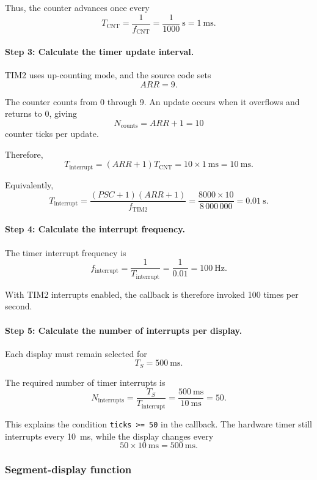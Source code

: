\documentclass[a4paper]{article}
\begin{document}
Thus, the counter advances once every
\[
    T_{\mathrm{CNT}}
    = \frac{1}{f_{\mathrm{CNT}}}
    = \frac{1}{1000}~\mathrm{s}
    = 1~\mathrm{ms}.
\]

\paragraph{Step 3: Calculate the timer update interval.}

TIM2 uses up-counting mode, and the source code sets
\[
    ARR = 9.
\]

The counter counts from 0 through 9. An update occurs
when it overflows and returns to 0, giving
\[
    N_{\mathrm{counts}} = ARR+1 = 10
\]
counter ticks per update.

Therefore,
\[
    T_{\mathrm{interrupt}}
    = (ARR+1)T_{\mathrm{CNT}}
    = 10 \times 1~\mathrm{ms}
    = 10~\mathrm{ms}.
\]

Equivalently,
\[
    T_{\mathrm{interrupt}}
    = \frac{(PSC+1)(ARR+1)}{f_{\mathrm{TIM2}}}
    = \frac{8000 \times 10}{8\,000\,000}
    = 0.01~\mathrm{s}.
\]

\paragraph{Step 4: Calculate the interrupt frequency.}

The timer interrupt frequency is
\[
    f_{\mathrm{interrupt}}
    = \frac{1}{T_{\mathrm{interrupt}}}
    = \frac{1}{0.01}
    = 100~\mathrm{Hz}.
\]

With TIM2 interrupts enabled, the callback is therefore
invoked 100 times per second.

\paragraph{Step 5: Calculate the number of interrupts per display.}

Each display must remain selected for
\[
    T_S = 500~\mathrm{ms}.
\]

The required number of timer interrupts is
\[
    N_{\mathrm{interrupts}}
    = \frac{T_S}{T_{\mathrm{interrupt}}}
    = \frac{500~\mathrm{ms}}{10~\mathrm{ms}}
    = 50.
\]

This explains the condition \texttt{ticks >= 50}
in the callback. The hardware timer still interrupts
every 10~ms, while the display changes every
\[
    50 \times 10~\mathrm{ms}
    = 500~\mathrm{ms}.
\]

\subsubsection{Segment-display function}
\end{document}
